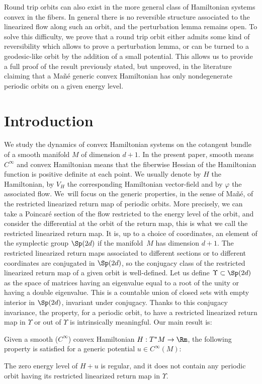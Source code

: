 Round trip orbits can also exist in the more general class of
Hamiltonian systems convex in the fibers. In general there is no reversible structure associated to the linearized flow along such an orbit, and the perturbation lemma remains open.
To solve this difficulty, we prove that a round trip orbit either admits some kind of reversibility which allows to prove a perturbation lemma, or can be turned to a geodesic-like orbit by the addition of a small potential.
This allows us to provide a full proof of the result previously stated, but unproved, in the literature claiming that a Mañé generic convex Hamiltonian has only nondegenerate periodic orbits on a given energy level.

\section{Introduction}

We study the dynamics of convex Hamiltonian systems on the cotangent bundle of a smooth manifold $M$ of dimension $d+1$.
In the present paper, smooth means $C^{\infty}$ and convex Hamiltonian means that the fiberwise Hessian
of the Hamiltonian function is positive definite at each point.
We usually denote by $H$ the Hamiltonian, by $V_H$ the corresponding Hamiltonian vector-field and by $\varphi$ the associated flow. We~will focus on the generic properties, in the sense of Mañé, of the restricted linearized return map of periodic orbits.
More precisely, we can take a Poincaré section
of the flow restricted to the energy level of the orbit, and consider the differential at the orbit of the return map, this is what we call the restricted linearized return map.
It is, up to a choice of coordinates, an element of the symplectic group $\Sp(2d)$ if
the manifold~$M$ has dimension $d+1$.
The restricted linearized return maps associated to different sections or to different coordinates are conjugated in $\Sp(2d)$, so the conjugacy class of the restricted linearized return map of a given orbit is well-defined.
Let us define $\Upsilon \subset \Sp(2d)$ as the space of matrices having an eigenvalue equal to a root of the unity or having a double eigenvalue. This is a countable union of closed sets with empty interior in $\Sp(2d)$, invariant under conjugacy.
Thanks to this conjugacy invariance, the property, for a periodic orbit, to have a restricted linearized return map in
$\Upsilon$ or out of $\Upsilon$ is intrinsically meaningful.
Our main result is:

\begin{thm}\label{thm-g1}
Given a smooth ($C^{\infty}$) convex Hamiltonian $H: T^*M\rightarrow \Rm$,
the following property is satisfied for a generic potential $u\in C^{\infty}(M)$:

The zero energy level of $H+u$ is regular, and it does not contain any periodic orbit having its restricted linearized return map in $\Upsilon$.
\end{thm}

